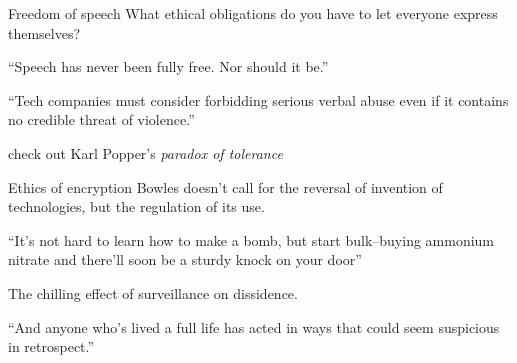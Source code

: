 \documentclass[presentation]{subfiles}
\begin{document}
\begin{frame}{Freedom of speech}
What ethical obligations do you have to let everyone express themselves?

``Speech has never been fully free. Nor should it be.''

``Tech companies must consider forbidding serious verbal abuse even if it contains no credible threat of violence.''

{\footnotesize check out Karl Popper's \textit{paradox of tolerance}}
\end{frame}

\begin{frame}{Ethics of encryption}
Bowles doesn't call for the reversal of invention of technologies, but the regulation of its use.

``It's not hard to learn how to make a bomb, but start bulk--buying ammonium nitrate and there'll soon be a sturdy knock on your door''

The chilling effect of surveillance on dissidence.

``And anyone who's lived a full life has acted in ways that could seem suspicious in retrospect.''


\end{frame}
\end{document}
